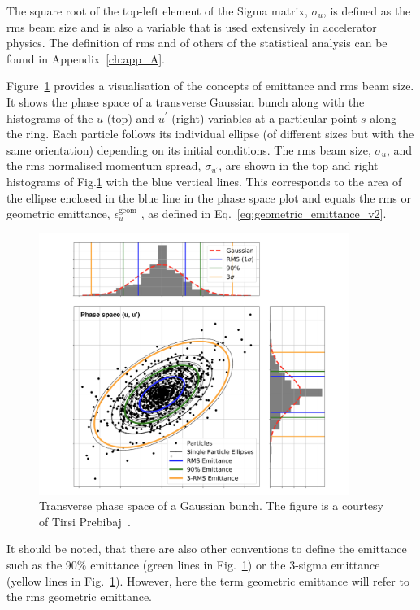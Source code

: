The square root of the top-left element of the Sigma matrix, $\sigma_u$, is defined as the rms beam size and is also a variable that is used extensively in accelerator physics. The definition of rms and of others of the statistical analysis can be found in Appendix~\ref{ch:app_A}.

Figure~\ref{fig:phase_space_emittance} provides a visualisation of the concepts of emittance and rms beam size. It shows the phase space of a transverse Gaussian bunch along with the histograms of the $u$ (top) and $u^\prime$ (right) variables at a particular point $s$ along the ring. Each particle follows its individual ellipse (of different sizes but with the same orientation) depending on its initial conditions. The rms beam size, $\sigma_u$, and the rms normalised momentum spread, $\sigma_{u^\prime}$, are shown in the top and right histograms of Fig.\ref{fig:phase_space_emittance} with the blue vertical lines. This corresponds to the area of the ellipse enclosed in the blue line in the phase space plot and equals the rms or geometric emittance, $\epsilon^{\mathrm{geom}}_u$ , as defined in Eq.~\eqref{eq:geometric_emittance_v2}.

\begin{figure}[!h] 
    \centering         
    \includegraphics[width=0.9\textwidth]{images/Ch2/transverse_phase_space_emittance.png}
        \caption{Transverse phase space of a Gaussian bunch. The figure is a courtesy of Tirsi Prebibaj~\cite{tirsi_thesis_presentation}.}
        \label{fig:phase_space_emittance}
 \end{figure}

It should be noted, that there are also other conventions to define the emittance such as the 90$\%$ emittance (green lines in Fig.~\ref{fig:phase_space_emittance}) or the 3-sigma emittance (yellow lines in Fig.~\ref{fig:phase_space_emittance}). However, here the term geometric emittance will refer to the rms geometric emittance.

